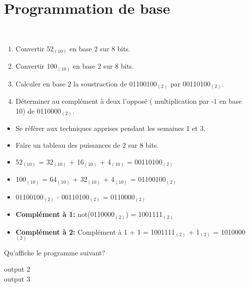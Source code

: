 \section{Programmation de base}

\begin{Exercice}[10 minutes]\\
    \begin{enumerate}
        \item Convertir 52$_{(10)}$ en base 2 sur 8 bits.
        \item Convertir 100$_{(10)}$ en base 2 sur 8 bits.
        \item Calculer en base 2 la soustraction de 01100100$_{(2)}$ par 00110100$_{(2)}$.
        \item Déterminer au complément à deux l'opposé ( multiplication par -1 en base 10) de 0110000$_{(2)}$.
    \end{enumerate}
\begin{conseil}
   \begin{itemize}
       \item Se référer aux techniques apprises pendant les semaines 1 et 3.
       \item Faire un tableau des puissances de 2 sur 8 bits.
   \end{itemize}
\end{conseil}
    
\begin{solution}
\begin{itemize}
    \item 52$_{(10)}$ = 32$_{(10)}$ + 16$_{(10)}$ + 4$_{(10)}$ = 00110100$_{(2)}$
    \item 100$_{(10)}$ = 64$_{(10)}$ + 32$_{(10)}$ + 4$_{(10)}$ = 01100100$_{(2)}$
    \item 01100100$_{(2)}$ - 00110100$_{(2)}$ = 0110000$_{(2)}$
    \item \textbf{Complément à 1:} not(0110000$_{(2)}$) = 1001111$_{(2)}$ 
    \item \textbf{Complément à 2:} Complément à 1 + 1 = 1001111$_{(2)}$ + 1$_{(2)}$ = 1010000$_{(2)}$
\end{itemize}   
\end{solution}

\end{Exercice}

\begin{Exercice}[5 minutes]
    Qu'affiche le programme suivant?
    

    \begin{solution}
        output 2 \\
        output 3
    \end{solution}
\end{Exercice}

